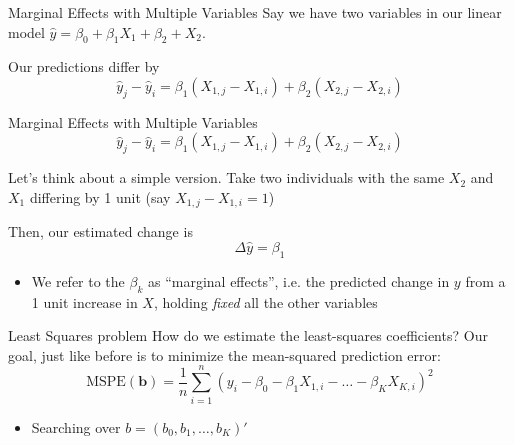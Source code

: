\documentclass[aspectratio=169,t,11pt,table]{beamer}
\begin{document}
\begin{frame}{Marginal Effects with Multiple Variables}
  Say we have two variables in our linear model $\hat{y} = \beta_0 + \beta_1 X_1 + \beta_2 + X_2$.

  Our predictions differ by
  $$
    \hat{y}_j - \hat{y}_i = \beta_1 (X_{1,j} - X_{1,i}) + \beta_2 (X_{2,j} - X_{2,i})
  $$
\end{frame}
  
\begin{frame}{Marginal Effects with Multiple Variables}
  \vspace*{-\bigskipamount}
  $$
    \hat{y}_j - \hat{y}_i = \beta_1 (X_{1,j} - X_{1,i}) + \beta_2 (X_{2,j} - X_{2,i})
  $$
  
  \bigskip
  Let's think about a simple version. 
  Take two individuals with the same $X_2$ and $X_1$ differing by 1 unit (say $X_{1,j} - X_{1,i} = 1$)

  \pause
  \bigskip
  Then, our estimated change is 
  $$
    \Delta \hat{y} = \beta_1
  $$
  \begin{itemize}
    \item We refer to the $\beta_k$ as ``marginal effects'', i.e. the predicted change in $y$ from a 1 unit increase in $X$, holding \emph{fixed} all the other variables
  \end{itemize}
\end{frame}

\begin{frame}{Least Squares problem}
  How do we estimate the least-squares coefficients? Our goal, just like before is to minimize the mean-squared prediction error:
  $$
    \text{MSPE}(\bm{b}) = \frac{1}{n} \sum_{i=1}^n (y_i - \beta_0 - \beta_1 X_{1,i} - \dots - \beta_K X_{K,i})^2
  $$

  \begin{itemize}
    \item Searching over $b = (b_0, b_1, \dots, b_K)'$
  \end{itemize}
\end{frame}
\end{document}
